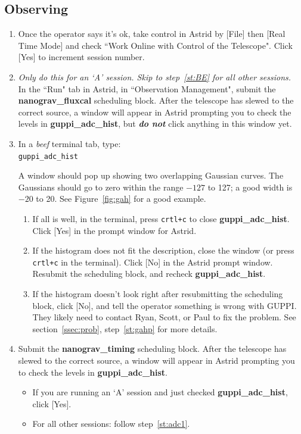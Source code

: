 \documentclass[11pt, reqno, tbtags]{article}
\begin{document}
\subsection{Observing}\label{ssec:qb} %
\begin{enumerate}
 \item Once the operator says it's ok, take control in Astrid by [File] then [Real Time Mode] and check ``Work Online with Control of the Telescope". Click [Yes] to increment session number. %
 \item \textit{Only do this for an `A' session. Skip to step~\ref{st:BE} for all other sessions.}   \\ %
 In the ``Run" tab in Astrid, in ``Observation Management", submit the \textbf{nanograv\_fluxcal} scheduling block.  
 After the telescope has slewed to the correct source, a window will appear in Astrid prompting you to check the levels in \textbf{guppi\_adc\_hist}, but \textbf{\textit{do not}} click anything in this window yet.
 \item \label{st:adc1} In a \textit{beef} terminal tab, type: \\ %
 \texttt{guppi\_adc\_hist}

 A window should pop up showing two overlapping Gaussian curves. The Gaussians should go to zero within the range $-127$ to 127; a good width is $-20$ to 20. 
 See Figure~\ref{fig:gah} for a good example.  \begin{enumerate}
  \item If all is well, in the terminal, press \texttt{crtl+c} to close \textbf{guppi\_adc\_hist}.  Click [Yes] in the prompt window for Astrid.  %
  \item If the histogram does not fit the description, close the window (or press \texttt{crtl+c} in the terminal).  Click [No] in the Astrid prompt window.  Resubmit the scheduling block, and recheck \textbf{guppi\_adc\_hist}. %
  \item If the histogram doesn't look right after resubmitting the scheduling block, click [No], and tell the operator something is wrong with GUPPI.  They likely need to contact Ryan, Scott, or Paul to fix the problem.  See section~\ref{ssec:prob}, step~\ref{st:gahp} for more details. %
 \end{enumerate}

 \item\label{st:BE} Submit the \textbf{nanograv\_timing} scheduling block. After the telescope has slewed to the correct source, a window will appear in Astrid prompting you to check the levels in \textbf{guppi\_adc\_hist}.  \begin{itemize} %
  \item If you are running an `A' session and just checked \textbf{guppi\_adc\_hist}, click [Yes].  %
  \item For all other sessions:  follow step~\ref{st:adc1}. %
 \end{itemize}


\end{enumerate}
\end{document}

